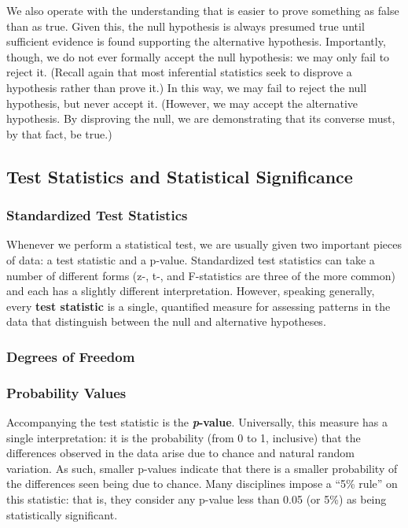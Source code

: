 We also operate with the understanding that is easier to prove something as false than as true. Given this, the null hypothesis is always presumed true until sufficient evidence is found supporting the alternative hypothesis. Importantly, though, we do not ever formally accept the null hypothesis: we may only fail to reject it. (Recall again that most inferential statistics seek to disprove a hypothesis rather than prove it.) In this way, we may fail to reject the null hypothesis, but never accept it. (However, we may accept the alternative hypothesis. By disproving the null, we are demonstrating that its converse must, by that fact, be true.)

\subsection{Test Statistics and Statistical Significance}

\subsubsection{Standardized Test Statistics}
Whenever we perform a statistical test, we are usually given two important pieces of data: a test statistic and a p-value. Standardized test statistics can take a number of different forms (z-, t-, and F-statistics are three of the more common) and each has a slightly different interpretation. However, speaking generally, every \textbf{test statistic} is a single, quantified measure for assessing patterns in the data that distinguish between the null and alternative hypotheses.

\subsubsection{Degrees of Freedom}

\subsubsection{Probability Values}
Accompanying the test statistic is the \textbf{\textit{p}-value}. Universally, this measure has a single interpretation: it is the probability (from 0 to 1, inclusive) that the differences observed in the data arise due to chance and natural random variation. As such, smaller p-values indicate that there is a smaller probability of the differences seen being due to chance. Many disciplines impose a ``5\% rule'' on this statistic: that is, they consider any p-value less than 0.05 (or 5\%) as being statistically significant.

